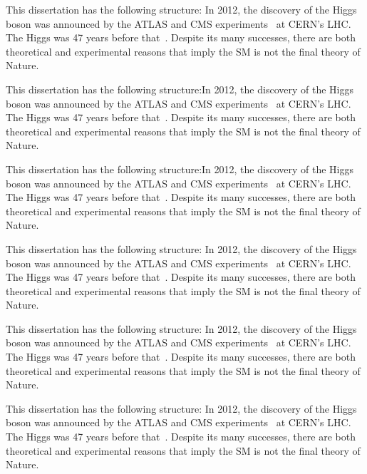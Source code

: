 This dissertation has the following structure:
In 2012, the discovery of the Higgs boson was announced by the ATLAS and CMS experiments~\cite{Higgs_discovery_2012_CMS,Higgs_discovery_2012_ATLAS,Higgs_discovery_2013_CMS} at CERN's LHC.
The Higgs was 47 years before that~\cite{Higgs_theory1,Higgs_theory2}.
Despite its many successes, there are both theoretical and experimental reasons that imply the SM is not the final theory of Nature.

This dissertation has the following structure:In 2012, the discovery of the Higgs boson was announced by the ATLAS and CMS experiments~\cite{Higgs_discovery_2012_CMS,Higgs_discovery_2012_ATLAS,Higgs_discovery_2013_CMS} at CERN's LHC.
The Higgs was 47 years before that~\cite{Higgs_theory1,Higgs_theory2}.
Despite its many successes, there are both theoretical and experimental reasons that imply the SM is not the final theory of Nature.

This dissertation has the following structure:In 2012, the discovery of the Higgs boson was announced by the ATLAS and CMS experiments~\cite{Higgs_discovery_2012_CMS,Higgs_discovery_2012_ATLAS,Higgs_discovery_2013_CMS} at CERN's LHC.
The Higgs was 47 years before that~\cite{Higgs_theory1,Higgs_theory2}.
Despite its many successes, there are both theoretical and experimental reasons that imply the SM is not the final theory of Nature.

This dissertation has the following structure:
In 2012, the discovery of the Higgs boson was announced by the ATLAS and CMS experiments~\cite{Higgs_discovery_2012_CMS,Higgs_discovery_2012_ATLAS,Higgs_discovery_2013_CMS} at CERN's LHC.
The Higgs was 47 years before that~\cite{Higgs_theory1,Higgs_theory2}.
Despite its many successes, there are both theoretical and experimental reasons that imply the SM is not the final theory of Nature.

This dissertation has the following structure:
In 2012, the discovery of the Higgs boson was announced by the ATLAS and CMS experiments~\cite{Higgs_discovery_2012_CMS,Higgs_discovery_2012_ATLAS,Higgs_discovery_2013_CMS} at CERN's LHC.
The Higgs was 47 years before that~\cite{Higgs_theory1,Higgs_theory2}.
Despite its many successes, there are both theoretical and experimental reasons that imply the SM is not the final theory of Nature.

This dissertation has the following structure:
In 2012, the discovery of the Higgs boson was announced by the ATLAS and CMS experiments~\cite{Higgs_discovery_2012_CMS,Higgs_discovery_2012_ATLAS,Higgs_discovery_2013_CMS} at CERN's LHC.
The Higgs was 47 years before that~\cite{Higgs_theory1,Higgs_theory2}.
Despite its many successes, there are both theoretical and experimental reasons that imply the SM is not the final theory of Nature.

